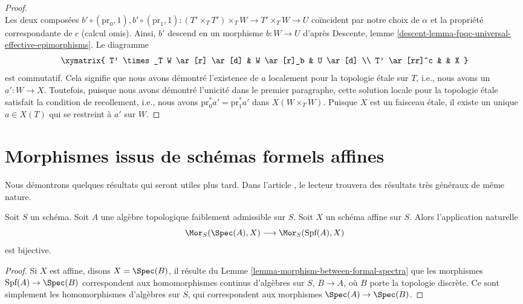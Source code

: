 \begin{proof}
$$$$
Les deux composées
$b' \circ (\text{pr}_0, 1), 
b' \circ (\text{pr}_1, 1) :
(T' \times_T T') \times_T W \to T' \times_T W \to U$
coïncident par notre choix de $\alpha$ et la propriété correspondante de $c$
(calcul omis). Ainsi, $b'$ descend en un morphisme $b : W \to U$ d'après
Descente, lemme \ref{descent-lemma-fpqc-universal-effective-epimorphisms}.
Le diagramme
$$
\xymatrix{
T' \times_T W \ar[r] \ar[d] & W \ar[r]_b & U \ar[d] \\
T' \ar[rr]^c &  & X
}
$$
est commutatif. Cela signifie que nous avons démontré l'existence
de $a$ localement pour la topologie \'etale sur $T$, i.e., nous avons un $a' : W \to X$.
Toutefois, puisque nous avons démontré l'unicité
dans le premier paragraphe, cette solution locale pour la topologie \'etale
satisfait la condition de recollement, i.e., nous avons
$\text{pr}_0^*a' = \text{pr}_1^*a'$ dans $X(W \times_T W)$.
Puisque $X$ est un faisceau \'etale, il existe un unique $a \in X(T)$ qui se restreint
à $a'$ sur $W$.
\end{proof}





\section{Morphismes issus de schémas formels affines}
\label{section-map-out-of}

\noindent
Nous démontrons quelques résultats qui seront utiles plus tard.
Dans l'article \cite{Bhatt-Algebraize}, le lecteur trouvera
des résultats très généraux de même nature.

\begin{lemma}
\label{lemma-map-into-affine}
Soit $S$ un schéma. Soit $A$ une algèbre topologique faiblement admissible
sur $S$. Soit $X$ un schéma affine sur $S$. Alors
l'application naturelle
$$
\Mor_S(\Spec(A), X)
\longrightarrow
\Mor_S(\text{Spf}(A), X)
$$
est bijective.
\end{lemma}

\begin{proof}
Si $X$ est affine, disons $X = \Spec(B)$, il résulte du
Lemme \ref{lemma-morphism-between-formal-spectra}
que les morphismes $\text{Spf}(A) \to \Spec(B)$ correspondent aux homomorphismes continus
d'algèbres sur $S$, $B \to A$, où $B$ porte la topologie discrète.
Ce sont simplement les homomorphismes d'algèbres sur $S$, qui correspondent aux morphismes
$\Spec(A) \to \Spec(B)$.
\end{proof}

